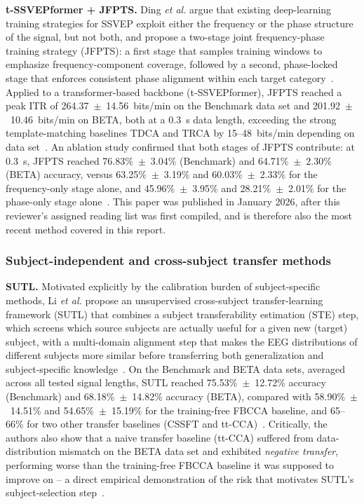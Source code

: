 \documentclass[11pt]{article}
\begin{document}
\textbf{t-SSVEPformer + JFPTS.} Ding \textit{et al.} argue that existing deep-learning training strategies for SSVEP exploit either the frequency or the phase structure of the signal, but not both, and propose a two-stage joint frequency-phase training strategy (JFPTS): a first stage that samples training windows to emphasize frequency-component coverage, followed by a second, phase-locked stage that enforces consistent phase alignment within each target category~\cite{ding2026jfpts}. Applied to a transformer-based backbone (t-SSVEPformer), JFPTS reached a peak ITR of 264.37~$\pm$~14.56~bits/min on the Benchmark data set and 201.92~$\pm$~10.46~bits/min on BETA, both at a 0.3~s data length, exceeding the strong template-matching baselines TDCA and TRCA by 15--48~bits/min depending on data set~\cite{ding2026jfpts}. An ablation study confirmed that both stages of JFPTS contribute: at 0.3~s, JFPTS reached 76.83\%~$\pm$~3.04\% (Benchmark) and 64.71\%~$\pm$~2.30\% (BETA) accuracy, versus 63.25\%~$\pm$~3.19\% and 60.03\%~$\pm$~2.33\% for the frequency-only stage alone, and 45.96\%~$\pm$~3.95\% and 28.21\%~$\pm$~2.01\% for the phase-only stage alone~\cite{ding2026jfpts}. This paper was published in January 2026, after this reviewer's assigned reading list was first compiled, and is therefore also the most recent method covered in this report.

\subsubsection{Subject-independent and cross-subject transfer methods}

\textbf{SUTL.} Motivated explicitly by the calibration burden of subject-specific methods, Li \textit{et al.} propose an unsupervised cross-subject transfer-learning framework (SUTL) that combines a subject transferability estimation (STE) step, which screens which source subjects are actually useful for a given new (target) subject, with a multi-domain alignment step that makes the EEG distributions of different subjects more similar before transferring both generalization and subject-specific knowledge~\cite{li2024sutl}. On the Benchmark and BETA data sets, averaged across all tested signal lengths, SUTL reached 75.53\%~$\pm$~12.72\% accuracy (Benchmark) and 68.18\%~$\pm$~14.82\% accuracy (BETA), compared with 58.90\%~$\pm$~14.51\% and 54.65\%~$\pm$~15.19\% for the training-free FBCCA baseline, and 65--66\% for two other transfer baselines (CSSFT and tt-CCA)~\cite{li2024sutl}. Critically, the authors also show that a naive transfer baseline (tt-CCA) suffered from data-distribution mismatch on the BETA data set and exhibited \emph{negative transfer}, performing worse than the training-free FBCCA baseline it was supposed to improve on -- a direct empirical demonstration of the risk that motivates SUTL's subject-selection step~\cite{li2024sutl}.
\end{document}
